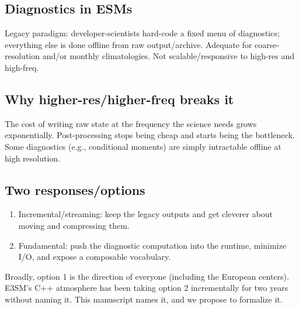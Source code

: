 \documentclass[gmd, manuscript]{copernicus}
\begin{document}
\begin{abstract}
Our thesis: We argue diagnostics are mathematical expressions represented by flexible
compositions of a small set of operators and an algebra over them
and that they should be evaluated by the model at runtime.
The result: A scientist can imagine a variable or product and \emph{project} it out
in a variety of productive ways --- instantaneous or averaged, over an arbitrary time period,
mapped, masked, or redefined --- without touching the source code.
\end{abstract}

\introduction  %

\subsection{Diagnostics in ESMs}
Legacy paradigm: developer-scientists hard-code a fixed menu of diagnostics; everything else is done offline from raw output/archive.
Adequate for coarse-resolution and/or monthly climatologies. Not scalable/responsive to high-res and high-freq.

\subsection{Why higher-res/higher-freq breaks it}
The cost of writing raw state at the frequency the science needs grows exponentially. Post-processing stops being cheap and starts being the bottleneck.
Some diagnostics (e.g., conditional moments) are simply intractable offline at high resolution.

\subsection{Two responses/options}
\begin{enumerate}
  \item Incremental/streaming: keep the legacy outputs and get cleverer about moving and compressing them.
  \item Fundamental: push the diagnostic computation into the runtime, minimize I/O, and expose a composable vocabulary.
\end{enumerate}

Broadly, option 1 is the direction of everyone (including the European centers).
E3SM's C++ atmosphere has been taking option 2 incrementally for two years without naming it.
This manuscript names it, and we propose to formalize it.
\end{document}
